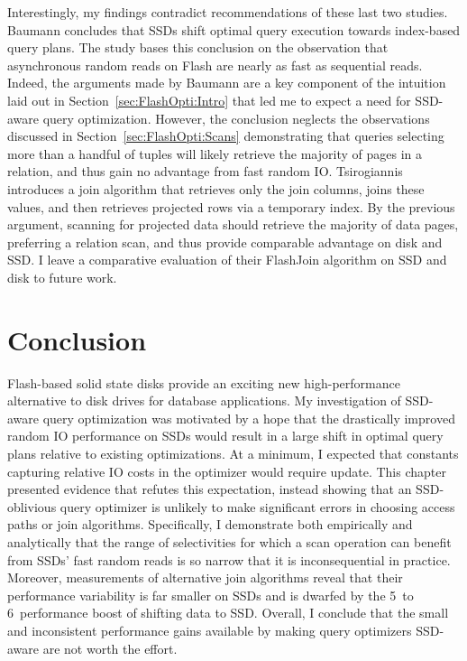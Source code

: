 Interestingly, my findings contradict recommendations of these last two studies.
Baumann concludes that SSDs shift optimal query execution towards index-based query plans.
The study bases this conclusion on the observation that asynchronous random reads on Flash are nearly as fast as sequential reads.
Indeed, the arguments made by Baumann are a key component of the intuition laid out in Section~\ref{sec:FlashOpti:Intro} that led me to expect a need for SSD-aware query optimization.
However, the conclusion neglects the observations discussed in Section~\ref{sec:FlashOpti:Scans} demonstrating that queries selecting more than a handful of tuples will likely retrieve the majority of pages in a relation, and thus gain no advantage from fast random IO.
Tsirogiannis introduces a join algorithm that retrieves only the join columns, joins these values, and then retrieves projected rows via a temporary index.
By the previous argument, scanning for projected data should retrieve the majority of data pages, preferring a relation scan, and thus provide comparable advantage on disk and SSD.
I leave a comparative evaluation of their FlashJoin algorithm on SSD and disk to future work.

\section{Conclusion}
\label{sec:FlashOpti:Conclusion}
Flash-based solid state disks provide an exciting new high-performance alternative to disk drives for database applications.
My investigation of SSD-aware query optimization was motivated by a hope that the drastically improved random IO performance on SSDs would result in a large shift in optimal query plans relative to existing optimizations.
At a minimum, I expected that constants capturing relative IO costs in the optimizer would require update.
This chapter presented evidence that refutes this expectation, instead showing that an SSD-oblivious query optimizer is unlikely to make significant errors in choosing access paths or join algorithms.
Specifically, I demonstrate both empirically and analytically that the range of selectivities for which a scan operation can benefit from SSDs' fast random reads is so narrow that it is inconsequential in practice.
Moreover, measurements of alternative join algorithms reveal that their performance variability is far smaller on SSDs and is dwarfed by the 5\texttimes~to 6\texttimes~performance boost of shifting data to SSD. 
Overall, I conclude that the small and inconsistent performance gains available by making query optimizers SSD-aware are not worth the effort.
